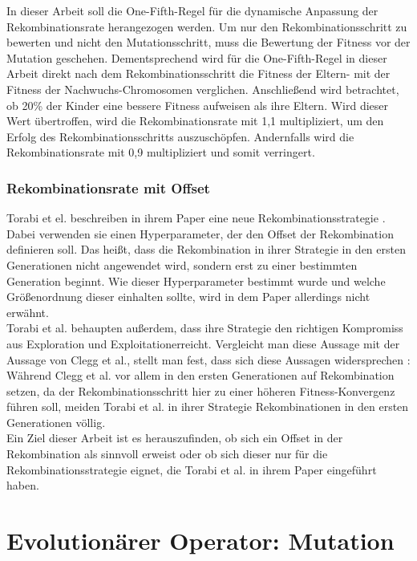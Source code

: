 In dieser Arbeit soll die One-Fifth-Regel für die dynamische Anpassung der Rekombinationsrate herangezogen werden.
Um nur den Rekombinationsschritt zu bewerten und nicht den Mutationsschritt, muss die Bewertung der Fitness vor der Mutation geschehen.
Dementsprechend wird für die One-Fifth-Regel in dieser Arbeit direkt nach dem Rekombinationsschritt die Fitness der Eltern- mit der Fitness der Nachwuchs-Chromosomen verglichen.
Anschließend wird betrachtet, ob 20\% der Kinder eine bessere Fitness aufweisen als ihre Eltern.
Wird dieser Wert übertroffen, wird die Rekombinationsrate mit 1,1 multipliziert, um den Erfolg des Rekombinationsschritts auszuschöpfen.
Andernfalls wird die Rekombinationsrate mit 0,9 multipliziert und somit verringert.


\subsubsection{Rekombinationsrate mit Offset}
\label{subsubsec:offsetCrossover}
Torabi et el. beschreiben in ihrem Paper eine neue Rekombinationsstrategie \cite{torabi_using_2022}.
Dabei verwenden sie einen Hyperparameter, der den Offset der Rekombination definieren soll.
Das heißt, dass die Rekombination in ihrer Strategie in den ersten Generationen nicht angewendet wird, sondern erst zu einer bestimmten Generation beginnt.
Wie dieser Hyperparameter bestimmt wurde und welche Größenordnung dieser einhalten sollte, wird in dem Paper allerdings nicht erwähnt.\\

Torabi et al. behaupten außerdem, dass ihre Strategie \glqq den richtigen Kompromiss aus Exploration und Exploitation\grqq\space erreicht.
Vergleicht man diese Aussage mit der Aussage von Clegg et al., stellt man fest, dass sich diese Aussagen widersprechen \cite{clegg_new_2007}:
Während Clegg et al. vor allem in den ersten Generationen auf Rekombination setzen, da der Rekombinationsschritt hier zu einer höheren Fitness-Konvergenz führen soll, meiden Torabi et al. in ihrer Strategie Rekombinationen in den ersten Generationen völlig.\\
Ein Ziel dieser Arbeit ist es herauszufinden, ob sich ein Offset in der Rekombination als sinnvoll erweist oder ob sich dieser nur für die Rekombinationsstrategie eignet, die Torabi et al. in ihrem Paper eingeführt haben.


\section{Evolutionärer Operator: Mutation}
\label{subsec:Mutation}

